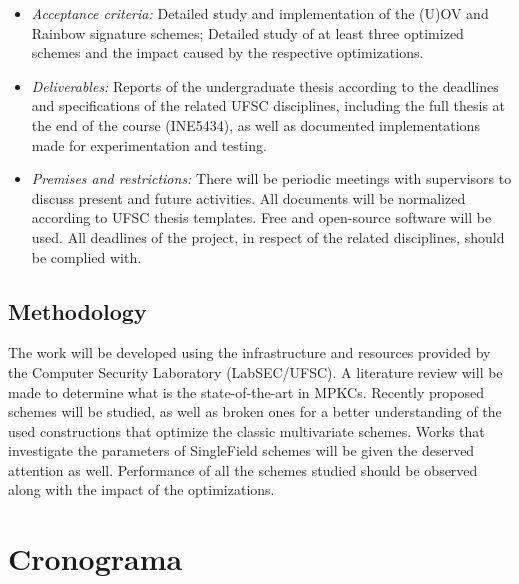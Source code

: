 \documentclass{ufsctex/ufsctex}
\begin{document}
\begin{itemize}
	\item \textit{Acceptance criteria:} Detailed study and implementation of
	the (U)OV and Rainbow signature schemes; Detailed study of at least three
	optimized schemes and the impact caused by the respective optimizations.

	\item \textit{Deliverables:} Reports of the undergraduate thesis according
	to the deadlines and specifications of the related UFSC disciplines,
	including the full thesis at the end of the course (INE5434), as well as
	documented implementations made for experimentation and testing.

	\item \textit{Premises and restrictions:} There will be periodic meetings
	with supervisors to discuss present and future activities. All documents
	will be normalized according to UFSC thesis templates. Free and open-source
	software will be used. All deadlines of the project, in respect of the
	related disciplines, should be complied with.

\end{itemize}

\section{Methodology}

The work will be developed using the infrastructure and resources provided by
the Computer Security Laboratory (LabSEC/UFSC). A literature review will be
made to determine what is the state-of-the-art in MPKCs. Recently proposed
schemes will be studied, as well as broken ones for a better understanding of
the used constructions that optimize the classic multivariate schemes. Works
that investigate the parameters of SingleField schemes will be given the
deserved attention as well. Performance of all the schemes studied should be
observed along with the impact of the optimizations.

\chapter{Cronograma}
\end{document}
